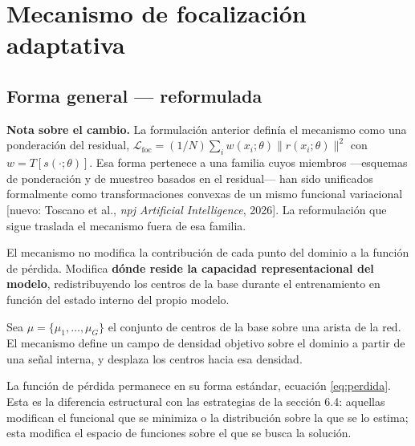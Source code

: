 
\section{Mecanismo de focalización adaptativa}

\subsection{Forma general — reformulada}

\textbf{Nota sobre el cambio.} La formulación anterior definía el mecanismo como una ponderación del residual, $\mathcal{L}_{\mathrm{foc}} = (1/N)\sum_i w(x_i;\theta)\lVert r(x_i;\theta)\rVert^2$ con $w=T[s(\cdot;\theta)]$. Esa forma pertenece a una familia cuyos miembros —esquemas de ponderación y de muestreo basados en el residual— han sido unificados formalmente como transformaciones convexas de un mismo funcional variacional [nuevo: Toscano et al., \textit{npj Artificial Intelligence}, 2026]. La reformulación que sigue traslada el mecanismo fuera de esa familia.

El mecanismo no modifica la contribución de cada punto del dominio a la función de pérdida. Modifica \textbf{dónde reside la capacidad representacional del modelo}, redistribuyendo los centros de la base durante el entrenamiento en función del estado interno del propio modelo.

Sea $\mu = \{\mu_1,\ldots,\mu_G\}$ el conjunto de centros de la base sobre una arista de la red. El mecanismo define un campo de densidad objetivo sobre el dominio a partir de una señal interna, y desplaza los centros hacia esa densidad.


La función de pérdida permanece en su forma estándar, ecuación \eqref{eq:perdida}. Esta es la diferencia estructural con las estrategias de la sección 6.4: aquellas modifican el funcional que se minimiza o la distribución sobre la que se lo estima; esta modifica el espacio de funciones sobre el que se busca la solución.

